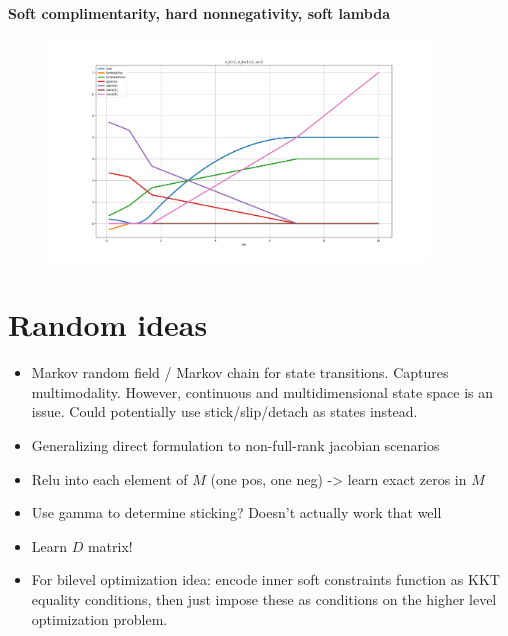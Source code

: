 \documentclass{article}
\begin{document}
\textbf{Soft complimentarity, hard nonnegativity, soft lambda}
\begin{figure}[H]
    \includegraphics[width=0.9\textwidth]{experiment3}
\end{figure}

\section{Random ideas}
\begin{itemize}
    \item Markov random field / Markov chain for state transitions. Captures multimodality. However, continuous and multidimensional state space is an issue. Could potentially use stick/slip/detach as states instead.
    \item Generalizing direct formulation to non-full-rank jacobian scenarios
    \item Relu into each element of $M$ (one pos, one neg) -> learn exact zeros in $M$
    \item Use gamma to determine sticking? Doesn't actually work that well
    \item Learn $D$ matrix!
    \item For bilevel optimization idea: encode inner soft constraints function as KKT equality conditions, then just impose these as conditions on the higher level optimization problem.
\end{itemize}
\end{document}
